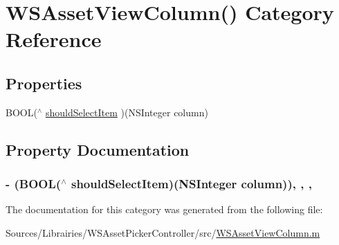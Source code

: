 \hypertarget{category_w_s_asset_view_column_07_08}{\section{W\-S\-Asset\-View\-Column() Category Reference}
\label{category_w_s_asset_view_column_07_08}
}
\subsection*{Properties}
\begin{DoxyCompactItemize}
\item 
B\-O\-O\-L($^\wedge$ \hyperlink{category_w_s_asset_view_column_07_08_a502cb99bcc9d243d1f337d1bf3b05961}{should\-Select\-Item} )(N\-S\-Integer column)
\end{DoxyCompactItemize}


\subsection{Property Documentation}
\hypertarget{category_w_s_asset_view_column_07_08_a502cb99bcc9d243d1f337d1bf3b05961}{
\subsubsection[{should\-Select\-Item}]{\setlength{\rightskip}{0pt plus 5cm}-\/ (B\-O\-O\-L($^\wedge$ should\-Select\-Item)(N\-S\-Integer column))\hspace{0.3cm}{\ttfamily [read]}, {\ttfamily [write]}, {\ttfamily [nonatomic]}, {\ttfamily [strong]}}}\label{category_w_s_asset_view_column_07_08_a502cb99bcc9d243d1f337d1bf3b05961}


The documentation for this category was generated from the following file\-:\begin{DoxyCompactItemize}
\item 
Sources/\-Librairies/\-W\-S\-Asset\-Picker\-Controller/src/\hyperlink{_w_s_asset_view_column_8m}{W\-S\-Asset\-View\-Column.\-m}\end{DoxyCompactItemize}
